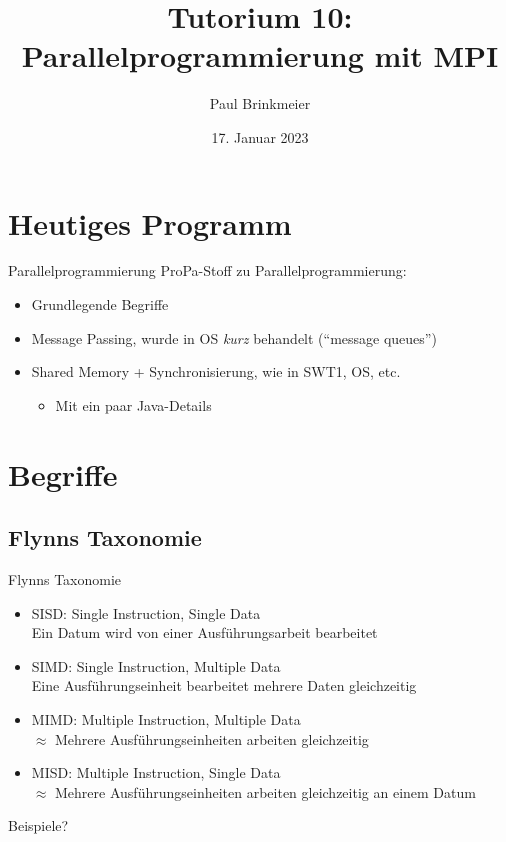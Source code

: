 \documentclass{beamer}
\title{Tutorium 10: Parallelprogrammierung mit MPI}
\author{Paul Brinkmeier}
\institute{Tutorium Programmierparadigmen am KIT}
\date{17. Januar 2023}
\begin{document}
\begin{frame}
	\titlepage
\end{frame}


\section{Heutiges Programm}

\begin{frame}{Parallelprogrammierung}
	ProPa-Stoff zu Parallelprogrammierung:

	\begin{itemize}
		\item Grundlegende Begriffe
		\item Message Passing, wurde in OS \emph{kurz} behandelt (\enquote{message queues})
		\item Shared Memory + Synchronisierung, wie in SWT1, OS, etc.
		\begin{itemize}
			\item Mit ein paar Java-Details
		\end{itemize}
	\end{itemize}
\end{frame}

\section{Begriffe}

\subsection{Flynns Taxonomie}

\begin{frame}{Flynns Taxonomie}
	\begin{itemize}
		\item SISD: Single Instruction, Single Data\\
			{\footnotesize Ein Datum wird von einer Ausführungsarbeit bearbeitet}
		\item SIMD: Single Instruction, Multiple Data\\
			{\footnotesize Eine Ausführungseinheit bearbeitet mehrere Daten gleichzeitig}
		\item MIMD: Multiple Instruction, Multiple Data\\
			{\footnotesize $\approx$ Mehrere Ausführungseinheiten arbeiten gleichzeitig}
		\item MISD: Multiple Instruction, Single Data\\
			{\footnotesize $\approx$ Mehrere Ausführungseinheiten arbeiten gleichzeitig an einem Datum}
	\end{itemize}

	\pause
	Beispiele?
\end{frame}
\end{document}

